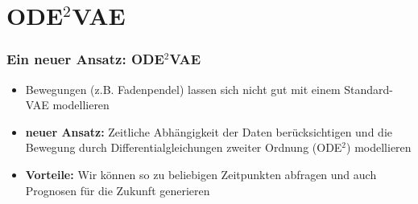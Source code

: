 

\author[Niklas Brunn]{Nix}


\beamertemplatenavigationsymbolsempty{}




\section{ODE$^{2}$VAE}





\begin{frame}
	\frametitle{Ein neuer Ansatz: \textbf{ODE$^{2}$VAE}}
	\begin{itemize}
	\item Bewegungen (z.B. Fadenpendel) lassen sich nicht gut mit einem Standard-VAE modellieren\\
	\item \textbf{neuer Ansatz:} Zeitliche Abhängigkeit der Daten berücksichtigen und die Bewegung durch Differentialgleichungen zweiter Ordnung (ODE$^{2}$) modellieren 
	\item \textbf{Vorteile:} Wir können so zu beliebigen Zeitpunkten abfragen und auch Prognosen für die Zukunft generieren
	\end{itemize}
\end{frame}




